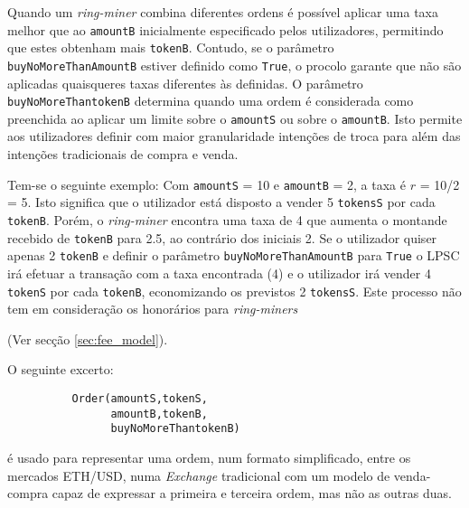 \documentclass[UTF8,nofonts]{article}
\begin{document}
\begin{multicols}{2}
Quando um \textit{ring-miner} combina diferentes ordens é possível aplicar uma taxa melhor que ao \verb|amountB| inicialmente especificado pelos utilizadores, permitindo que estes obtenham mais \verb|tokenB|. Contudo, se o parâmetro \verb|buyNoMoreThanAmountB| estiver definido como \verb|True|, o procolo garante que não são aplicadas quaisqueres taxas diferentes às definidas. O parâmetro \verb|buyNoMoreThantokenB| determina quando uma ordem é considerada como preenchida ao aplicar um limite sobre o \verb|amountS| ou sobre o \verb|amountB|. Isto permite aos utilizadores definir com maior granularidade intenções de troca para além das intenções tradicionais de compra e venda.


Tem-se o seguinte exemplo: Com \verb|amountS| = 10 e \verb|amountB| = 2, a taxa é $r$ = 10/2 = 5. Isto significa que o utilizador está disposto a vender 5 \verb|tokensS| por cada \verb|tokenB|. Porém, o \textit{ring-miner} encontra uma taxa de 4 que aumenta o montande recebido de \verb|tokenB| para 2.5, ao contrário dos iniciais 2. Se o utilizador quiser apenas 2 \verb|tokenB| e definir o parâmetro \verb|buyNoMoreThanAmountB| para \verb|True| o LPSC irá efetuar a transação com a taxa encontrada (4) e o utilizador irá vender 4 \verb|tokenS| por cada \verb|tokenB|, economizando os previstos 2 \verb|tokensS|. Este processo não tem em consideração os honorários para \textit{ring-miners} 

(Ver secção \ref{sec:fee_model}).

O seguinte excerto:

\begin{verbatim}
	      Order(amountS,tokenS,
	            amountB,tokenB,
	            buyNoMoreThantokenB)
\end{verbatim}

é usado para representar uma ordem, num formato simplificado, entre os mercados ETH/USD, numa \textit{Exchange} tradicional com um modelo de venda-compra capaz de expressar a primeira e terceira ordem, mas não as outras duas.


\end{multicols}
\end{document}

